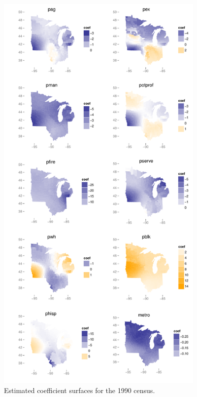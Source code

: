 \documentclass[authoryear, review, 11pt]{elsarticle}
\begin{document}
	\begin{figure}
		\begin{center}
			\includegraphics[height=8in]{../../figures/poverty/1990.linear.coefficients.pdf}
			\caption{Estimated coefficient surfaces for the 1990 census.\label{fig:census-coefs-1990}}
		\end{center}
	\end{figure}
	
\end{document}
